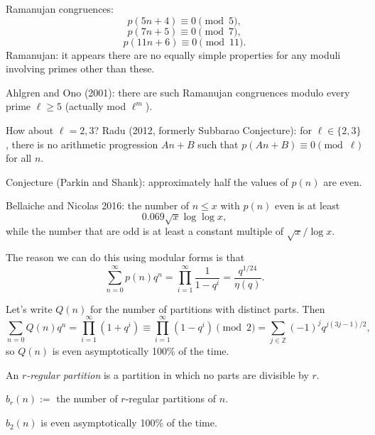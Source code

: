 \documentclass[reqno]{amsart} 
\begin{document}
Ramanujan congruences:
\begin{equation*}
  p(5 n + 4) \equiv 0 \pmod{5},
\end{equation*}
\begin{equation*}
  p(7 n + 5) \equiv 0 \pmod{7},
\end{equation*}
\begin{equation*}
  p(11 n + 6) \equiv 0 \pmod{11}.
\end{equation*}
Ramanujan: it appears there are no equally simple properties for any moduli involving primes other than these.

Ahlgren and Ono (2001): there are such Ramanujan congruences modulo every prime $\ell \geq 5$ (actually mod $\ell^m$).

How about $\ell = 2, 3$?  Radu (2012, formerly Subbarao Conjecture): for $\ell \in \{2, 3\}$, there is no arithmetic progression $A n + B$ such that
$p(A n + B) \equiv 0 \pmod{\ell}$ for all $n$.

Conjecture (Parkin and Shank): approximately half the values of $p(n)$ are even.

Bellaiche and Nicolas 2016: the number of $n \leq x$ with $p(n)$ even is at least
\begin{equation*}
  0.069 \sqrt{x} \log \log x,
\end{equation*}
while the number that are odd is at least a constant multiple of $\sqrt{x}/ \log x$.

The reason we can do this using modular forms is that
\begin{equation*}
  \sum_{n = 0}^{\infty} p(n) q^n = \prod_{i = 1}^\infty \frac{1}{1 - q^i} = \frac{q^{1/24}}{\eta(q)}.
\end{equation*}

Let's write $Q(n)$ for the number of partitions with distinct parts.  Then
\begin{equation*}
  \sum_{n = 0} Q(n) q^n = \prod_{i = 1}^\infty(1 + q^i) \equiv \prod_{i = 1}^\infty(1 - q^i) \pmod{2}
  =
  \sum_{j \in \mathbb{Z}}(- 1)^j q^{j(3j - 1)/2},
\end{equation*}
so $Q(n)$ is even asymptotically 100\% of the time.

\begin{definition}
  An $r$\emph{-regular partition} is a partition in which no parts are divisible by $r$.
\end{definition}
\begin{notation}
  $b_r(n) := $ the number of $r$-regular partitions of $n$.
\end{notation}
$b_2(n)$ is even asymptotically 100\% of the time.
\end{document}
